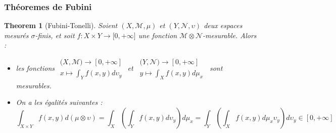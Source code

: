 \documentclass[3pt]{article}
\newtheorem{theorem}{Theorem}
\begin{document}
\subsubsection{Th\'{e}oremes de Fubini}

\bigskip

\begin{theorem}[Fubini-Tonelli]
Soient $(X,\mathcal{M},\mu )$ et $(Y,\mathcal{N},\upsilon )$ deux espaces
mesur\'{e}s $\sigma $-finis, et soit $f:X\times Y\rightarrow \lbrack
0,+\infty ]$ une fonction $\mathcal{M}\otimes \mathcal{N}$-mesurable. Alors :

\begin{itemize}
\item les fonctions $%
\begin{array}{c}
(X,\mathcal{M)\rightarrow }\left[ 0,+\infty \right] \\ 
x\mapsto \int_{Y}f(x,y)d\upsilon _{y}%
\end{array}%
$ et\ $%
\begin{array}{c}
(Y,\mathcal{N)\rightarrow }\left[ 0,+\infty \right] \\ 
y\mapsto \int_{X}f(x,y)d\mu _{x}%
\end{array}%
$\ sont mesurables.

\item On a les \'{e}galit\'{e}s suivantes :%
\begin{equation*}
\int_{X\times Y}f(x,y)d(\mu \otimes \upsilon )=\int_{X}\left(
\int_{Y}f(x,y)d\upsilon _{y}\right) d\mu _{x}=\int_{Y}\left(
\int_{X}f(x,y)d\mu _{x}\upsilon _{y}\right) d\upsilon _{y}\in \left[
0,+\infty \right]
\end{equation*}
\end{itemize}
\end{theorem}

\bigskip
\end{document}
